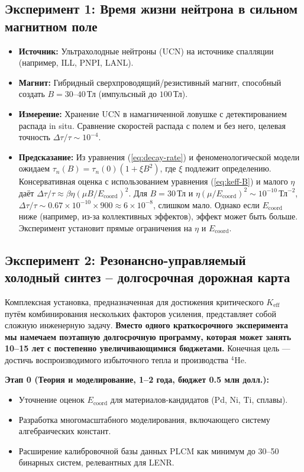 \documentclass[12pt]{article}
\theoremstyle{remark}
\newcommand{\Keff}{K_{\mathrm{eff}}}
\begin{document}
	\subsection{Эксперимент 1: Время жизни нейтрона в сильном магнитном поле}
	
	\begin{itemize}
		\item \textbf{Источник:} Ультрахолодные нейтроны (UCN) на источнике спалляции (например, ILL, PNPI, LANL).
		\item \textbf{Магнит:} Гибридный сверхпроводящий/резистивный магнит, способный создать \(B = 30\)–\(40\,\text{Тл}\) (импульсный до \(100\,\text{Тл}\)).
		\item \textbf{Измерение:} Хранение UCN в намагниченной ловушке с детектированием распада in situ. Сравнение скоростей распада с полем и без него, целевая точность \(\Delta \tau / \tau \sim 10^{-4}\).
		\item \textbf{Предсказание:} Из уравнения (\ref{eq:decay-rate}) и феноменологической модели ожидаем \(\tau_n(B) = \tau_n(0) (1 + \xi B^2)\), где \(\xi\) подлежит определению. Консервативная оценка с использованием уравнения (\ref{eq:keff-B}) и малого \(\eta\) даёт \(\Delta \tau/\tau \approx \beta \eta (\mu B/E_{\mathrm{coord}})^2\). Для \(B = 30\,\text{Тл}\) и \(\eta (\mu/E_{\mathrm{coord}})^2 \sim 10^{-10}\,\text{Тл}^{-2}\), \(\Delta \tau/\tau \sim 0.67 \times 10^{-10} \times 900 \approx 6\times10^{-8}\), слишком мало. Однако если \(E_{\mathrm{coord}}\) ниже (например, из-за коллективных эффектов), эффект может быть больше. Эксперимент установит прямые ограничения на \(\eta\) и \(E_{\mathrm{coord}}\).
	\end{itemize}
	
	\subsection{Эксперимент 2: Резонансно-управляемый холодный синтез – долгосрочная дорожная карта}
	
	Комплексная установка, предназначенная для достижения критического \(\Keff\) путём комбинирования нескольких факторов усиления, представляет собой сложную инженерную задачу. \textbf{Вместо одного краткосрочного эксперимента мы намечаем поэтапную долгосрочную программу, которая может занять 10–15 лет с постепенно увеличивающимися бюджетами.} Конечная цель — достичь воспроизводимого избыточного тепла и производства \(^4\)He.
	
	\textbf{Этап 0 (Теория и моделирование, 1–2 года, бюджет 0.5 млн долл.):}
	\begin{itemize}
		\item Уточнение оценок \(E_{\mathrm{coord}}\) для материалов-кандидатов (Pd, Ni, Ti, сплавы).
		\item Разработка многомасштабного моделирования, включающего систему алгебраических констант.
		\item Расширение калибровочной базы данных PLCM как минимум до 30–50 бинарных систем, релевантных для LENR.
	\end{itemize}
	
\end{document}
